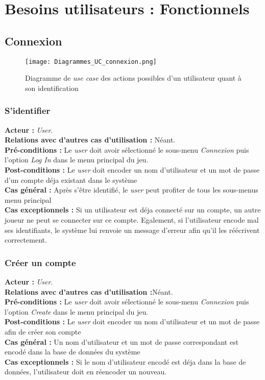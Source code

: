 \documentclass[10pt, a4paper]{article}
\begin{document}

\section{Besoins utilisateurs : Fonctionnels}
		
		
\subsection{Connexion}

\begin{figure}
\texttt{[image: Diagrammes\_UC\_connexion.png]}
\caption{Diagramme de \textit{use case} des actions possibles d'un utilisateur quant à son identification}
\label{UC_menu} %
\end{figure}

\subsubsection{S'identifier}
\textbf{Acteur :} \textit{User}.\\
\textbf{Relations avec d'autres cas d'utilisation :} Néant.\\
\textbf{Pré-conditions :} Le \textit{user} doit avoir sélectionné le sous-menu \textit{Connexion} puis l'option {\itshape Log In} dans le menu principal du jeu.\\
\textbf{Post-conditions :} Le \textit{user} doit encoder un nom d'utilisateur et un mot de passe d'un compte déja existant dans le système \\
\textbf{Cas général :} Après s'être identifié, le \textit{user} peut profiter de tous les sous-menus menu principal\\
\textbf{Cas exceptionnels :} Si un utilisateur est déja connecté sur un compte, un autre joueur ne peut se connecter sur ce compte. Egalement, si l'utilisateur encode mal ses identifiants, le système lui renvoie un message d'erreur afin qu'il les réécrivent correctement.



\subsubsection{Créer un compte}
\textbf{Acteur :} \textit{User}.\\
\textbf{Relations avec d'autres cas d'utilisation :}Néant.\\
\textbf{Pré-conditions :} Le \textit{user} doit avoir sélectionné le sous-menu \textit{Connexion} puis l'option {\itshape Create} dans le menu principal du jeu.\\
\textbf{Post-conditions :} Le \textit{user} doit encoder un nom d'utilisateur et un mot de passe afin de créer son compte\\
\textbf{Cas général :} Un nom d'utilisateur et un mot de passe correspondant est encodé dans la base de données du système\\
\textbf{Cas exceptionnels :} Si le nom d'utilisateur encodé est déja dans la base de données, l'utilisateur doit en réencoder un nouveau.
\end{document}
